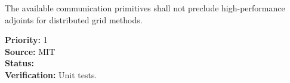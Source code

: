 
The available communication primitives shall not preclude high-performance 
adjoints for distributed grid methods.

\begin{reqlist}
  {\bf Priority:} 1 \\
  {\bf Source:}  MIT \\
  {\bf Status:}  \\
  {\bf Verification:} Unit tests. \\
\end{reqlist}










